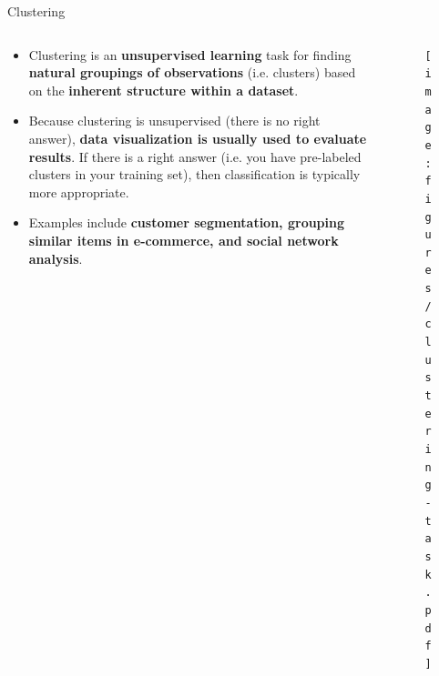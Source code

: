 \documentclass[document.tex]{subfiles}
\begin{document}
    \begin{frame}{Clustering}
        \begin{columns}
            \begin{column}{.6\textwidth}
                \begin{itemize}
                    \item Clustering is an \textbf{unsupervised learning} task for finding \textbf{natural groupings of observations} (i.e. clusters) based on the \textbf{inherent structure within a dataset}. 
                    \item Because clustering is unsupervised (there is no right answer), \textbf{data visualization is usually used to evaluate results}. If there is a right answer (i.e. you have pre-labeled clusters in your training set), then classification is typically more appropriate.
                    \item Examples include \textbf{customer segmentation, grouping similar items in e-commerce, and social network analysis}.
                \end{itemize}
            \end{column}
            \begin{column}{.4\textwidth}
                \begin{figure}
                    \label{fig:clustering-task}
                    \texttt{[image: figures/clustering-task.pdf]}
                \end{figure}
            \end{column}
        \end{columns}
    \end{frame}
\end{document}
